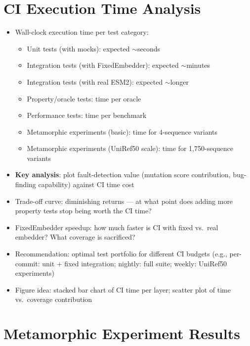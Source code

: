 \section{CI Execution Time Analysis}\label{sec:eval-time}
\begin{itemize}
  \item Wall-clock execution time per test category:
    \begin{itemize}
      \item Unit tests (with mocks): expected $\sim$seconds
      \item Integration tests (with FixedEmbedder): expected $\sim$minutes
      \item Integration tests (with real ESM2): expected $\sim$longer
      \item Property/oracle tests: time per oracle
      \item Performance tests: time per benchmark
      \item Metamorphic experiments (basic): time for 4-sequence variants
      \item Metamorphic experiments (UniRef50 scale): time for 1,750-sequence variants
    \end{itemize}
  \item \textbf{Key analysis}: plot fault-detection value (mutation score contribution, bug-finding capability) against CI time cost
  \item Trade-off curve: diminishing returns --- at what point does adding more property tests stop being worth the CI time?
  \item FixedEmbedder speedup: how much faster is CI with fixed vs.\ real embedder? What coverage is sacrificed?
  \item Recommendation: optimal test portfolio for different CI budgets (e.g., per-commit: unit + fixed integration; nightly: full suite; weekly: UniRef50 experiments)
  \item Figure idea: stacked bar chart of CI time per layer; scatter plot of time vs.\ coverage contribution
\end{itemize}

\section{Metamorphic Experiment Results}\label{sec:eval-metamorphic}

